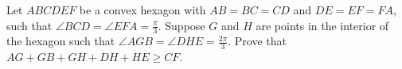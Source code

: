 Let $ ABCDEF$ be a convex hexagon with $ AB = BC = CD$ and $ DE = EF = FA$,   such that $ \angle BCD = \angle EFA = \frac {\pi}{3}$. Suppose $ G$ and $ H$ are points in the interior of the hexagon such that $ \angle AGB = \angle DHE = \frac {2\pi}{3}$. Prove that $ AG + GB + GH + DH + HE \geq CF$.